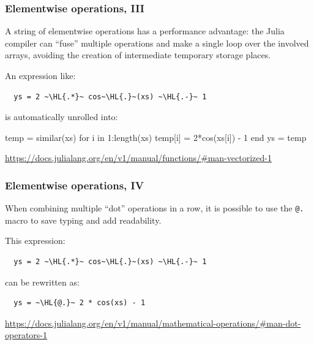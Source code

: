 \documentclass[english,serif,mathserif,xcolor=pdftex,dvipsnames,table]{beamer}
\begin{document}
\begin{frame}
  \frametitle{Elementwise operations, III}
  A string of elementwise operations has a performance advantage: the
  Julia compiler can ``fuse'' multiple operations and make a
  single loop over the involved arrays, avoiding the creation
  of intermediate temporary storage places.

  \+
  An expression like:
\begin{lstlisting}
  ys = 2 ~\HL{.*}~ cos~\HL{.}~(xs) ~\HL{.-}~ 1
\end{lstlisting}
  is automatically unrolled into:
\begin{jl}
  temp = similar(xs)
  for i in 1:length(xs)
    temp[i] = 2*cos(xs[i]) - 1
  end
  ys = temp
\end{jl}

  \+
  \begin{references}
    \url{https://docs.julialang.org/en/v1/manual/functions/#man-vectorized-1}
  \end{references}
\end{frame}


\begin{frame}[fragile]
  \frametitle{Elementwise operations, IV}
  When combining multiple ``dot'' operations in a row, it is possible
  to use the \texttt{@.} macro to save typing and add readability.

  \+
  This expression:
\begin{lstlisting}
  ys = 2 ~\HL{.*}~ cos~\HL{.}~(xs) ~\HL{.-}~ 1
\end{lstlisting}
  can be rewritten as:
\begin{lstlisting}
  ys = ~\HL{@.}~ 2 * cos(xs) - 1
\end{lstlisting}

  \+
  \begin{references}
    \url{https://docs.julialang.org/en/v1/manual/mathematical-operations/#man-dot-operators-1}
  \end{references}
\end{frame}
\end{document}
